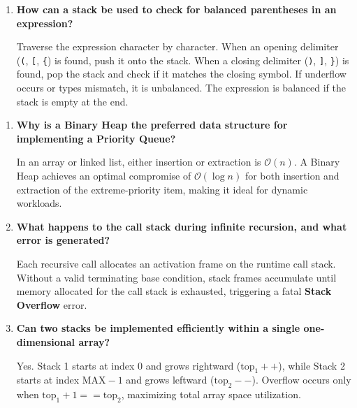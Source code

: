 \documentclass[12pt,a4paper]{article}
\newcommand{\Q}[1]{\textbf{#1}\par\noindent\ignorespaces}
\begin{document}
\begin{tcolorbox}[exambox, title={\textbf{Frequently Asked / Viva Questions (Part 1)}}]
\begin{enumerate}[topsep=0pt, label=\textbf{Q\arabic*.}, itemsep=4pt]
  \item \Q{How can a stack be used to check for balanced parentheses in an expression?}
  Traverse the expression character by character. When an opening delimiter (\texttt{(}, \texttt{[}, \texttt{\{}) is found, push it onto the stack. When a closing delimiter (\texttt{)}, \texttt{]}, \texttt{\}}) is found, pop the stack and check if it matches the closing symbol. If underflow occurs or types mismatch, it is unbalanced. The expression is balanced if the stack is empty at the end.
\end{enumerate}
\end{tcolorbox}

\newpage

\begin{tcolorbox}[exambox, title={\textbf{Frequently Asked / Viva Questions (Part 2)}}]
\begin{enumerate}[topsep=0pt, label=\textbf{Q\arabic*.}, itemsep=4pt, start=8]
  \item \Q{Why is a Binary Heap the preferred data structure for implementing a Priority Queue?}
  In an array or linked list, either insertion or extraction is $\mathcal{O}(n)$. A Binary Heap achieves an optimal compromise of $\mathcal{O}(\log n)$ for both insertion and extraction of the extreme-priority item, making it ideal for dynamic workloads.

  \item \Q{What happens to the call stack during infinite recursion, and what error is generated?}
  Each recursive call allocates an activation frame on the runtime call stack. Without a valid terminating base condition, stack frames accumulate until memory allocated for the call stack is exhausted, triggering a fatal \textbf{Stack Overflow} error.

  \item \Q{Can two stacks be implemented efficiently within a single one-dimensional array?}
  Yes. Stack 1 starts at index $0$ and grows rightward ($\text{top}_1++$), while Stack 2 starts at index $\text{MAX}-1$ and grows leftward ($\text{top}_2--$). Overflow occurs only when $\text{top}_1 + 1 == \text{top}_2$, maximizing total array space utilization.
\end{enumerate}
\end{tcolorbox}

\vspace{3pt}
\end{document}
